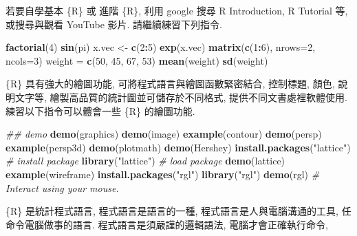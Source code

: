 \documentclass[
]{book}
\newenvironment{Shaded}{\begin{snugshade}}{\end{snugshade}}
\newcommand{\CommentTok}[1]{\textcolor[rgb]{0.56,0.35,0.01}{\textit{#1}}}
\newcommand{\DataTypeTok}[1]{\textcolor[rgb]{0.13,0.29,0.53}{#1}}
\newcommand{\DecValTok}[1]{\textcolor[rgb]{0.00,0.00,0.81}{#1}}
\newcommand{\KeywordTok}[1]{\textcolor[rgb]{0.13,0.29,0.53}{\textbf{#1}}}
\newcommand{\NormalTok}[1]{#1}
\newcommand{\OperatorTok}[1]{\textcolor[rgb]{0.81,0.36,0.00}{\textbf{#1}}}
\newcommand{\StringTok}[1]{\textcolor[rgb]{0.31,0.60,0.02}{#1}}
\begin{document}
若要自學基本 \{R\} 或 進階 \{R\},
利用 google 搜尋 R Introduction, R Tutorial 等,
或搜尋與觀看 YouTube 影片.
請繼續練習下列指令.

\begin{Shaded}
\begin{Highlighting}[]
\KeywordTok{factorial}\NormalTok{(}\DecValTok{4}\NormalTok{)}
\KeywordTok{sin}\NormalTok{(pi)}
\NormalTok{x.vec \textless{}{-}}\StringTok{ }\KeywordTok{c}\NormalTok{(}\DecValTok{2}\OperatorTok{:}\DecValTok{5}\NormalTok{)}
\KeywordTok{exp}\NormalTok{(x.vec)}
\KeywordTok{matrix}\NormalTok{(}\KeywordTok{c}\NormalTok{(}\DecValTok{1}\OperatorTok{:}\DecValTok{6}\NormalTok{), }\DataTypeTok{nrows=}\DecValTok{2}\NormalTok{, }\DataTypeTok{ncols=}\DecValTok{3}\NormalTok{)}
\NormalTok{weight =}\StringTok{ }\KeywordTok{c}\NormalTok{(}\DecValTok{50}\NormalTok{, }\DecValTok{45}\NormalTok{, }\DecValTok{67}\NormalTok{, }\DecValTok{53}\NormalTok{)}
\KeywordTok{mean}\NormalTok{(weight)}
\KeywordTok{sd}\NormalTok{(weight)}
\end{Highlighting}
\end{Shaded}

\{R\} 具有強大的繪圖功能, 可將程式語言與繪圖函數緊密結合,
控制標題, 顏色, 說明文字等, 繪製高品質的統計圖並可儲存於不同格式,
提供不同文書處裡軟體使用.
練習以下指令可以體會一些 \{R\} 的繪圖功能.

\begin{Shaded}
\begin{Highlighting}[]
\CommentTok{\#\# demo}
\KeywordTok{demo}\NormalTok{(graphics)}
\KeywordTok{demo}\NormalTok{(image)}
\KeywordTok{example}\NormalTok{(contour)}
\KeywordTok{demo}\NormalTok{(persp)}
\KeywordTok{example}\NormalTok{(persp3d)}
\KeywordTok{demo}\NormalTok{(plotmath)}
\KeywordTok{demo}\NormalTok{(Hershey)}
\KeywordTok{install.packages}\NormalTok{(}\StringTok{"lattice"}\NormalTok{) }\CommentTok{\# install package}
\KeywordTok{library}\NormalTok{(}\StringTok{"lattice"}\NormalTok{)          }\CommentTok{\# load package}
\KeywordTok{demo}\NormalTok{(lattice)}
\KeywordTok{example}\NormalTok{(wireframe)}
\KeywordTok{install.packages}\NormalTok{(}\StringTok{"rgl"}\NormalTok{)}
\KeywordTok{library}\NormalTok{(}\StringTok{"rgl"}\NormalTok{)}
\KeywordTok{demo}\NormalTok{(rgl)                   }\CommentTok{\# Interact using your mouse.}
\end{Highlighting}
\end{Shaded}

\{R\} 是統計程式語言,
程式語言是語言的一種,
程式語言是人與電腦溝通的工具, 任命令電腦做事的語言.
程式語言是須嚴謹的邏輯語法, 電腦才會正確執行命令,
\end{document}
